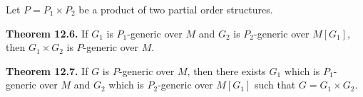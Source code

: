 Let $P = P_1 \times P_2$ be a product of two partial order structures.

\textbf{Theorem 12.6.} If $G_1$ is $P_1$-generic over $M$ and $G_2$ is $P_2$-generic over $M[G_1]$, then $G_1 \times G_2$ is $P$-generic over $M$.

\textbf{Theorem 12.7.} If $G$ is $P$-generic over $M$, then there exists $G_1$ which is $P_1$-generic over $M$ and $G_2$ which is $P_2$-generic over $M[G_1]$ such that $G = G_1 \times G_2$.
